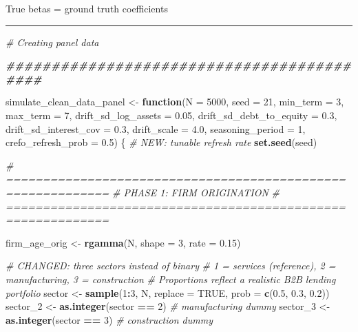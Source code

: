 \documentclass[
]{article}
\newenvironment{Shaded}{\begin{snugshade}}{\end{snugshade}}
\newcommand{\AttributeTok}[1]{\textcolor[rgb]{0.13,0.29,0.53}{#1}}
\newcommand{\CommentTok}[1]{\textcolor[rgb]{0.56,0.35,0.01}{\textit{#1}}}
\newcommand{\ConstantTok}[1]{\textcolor[rgb]{0.56,0.35,0.01}{#1}}
\newcommand{\ControlFlowTok}[1]{\textcolor[rgb]{0.13,0.29,0.53}{\textbf{#1}}}
\newcommand{\DecValTok}[1]{\textcolor[rgb]{0.00,0.00,0.81}{#1}}
\newcommand{\DocumentationTok}[1]{\textcolor[rgb]{0.56,0.35,0.01}{\textbf{\textit{#1}}}}
\newcommand{\FloatTok}[1]{\textcolor[rgb]{0.00,0.00,0.81}{#1}}
\newcommand{\FunctionTok}[1]{\textcolor[rgb]{0.13,0.29,0.53}{\textbf{#1}}}
\newcommand{\NormalTok}[1]{#1}
\newcommand{\OtherTok}[1]{\textcolor[rgb]{0.56,0.35,0.01}{#1}}
\newcommand{\SpecialCharTok}[1]{\textcolor[rgb]{0.81,0.36,0.00}{\textbf{#1}}}
\begin{document}
True betas = ground truth coefficients

\begin{center}\rule{0.5\linewidth}{0.5pt}\end{center}

\begin{Shaded}
\begin{Highlighting}[]
\CommentTok{\# Creating panel data}

\DocumentationTok{\#\#\#\#\#\#\#\#\#\#\#\#\#\#\#\#\#\#\#\#\#\#\#\#\#\#\#\#\#\#\#\#\#\#\#\#\#\#\#\#\#\#}

\NormalTok{simulate\_clean\_data\_panel }\OtherTok{\textless{}{-}} \ControlFlowTok{function}\NormalTok{(}\AttributeTok{N =} \DecValTok{5000}\NormalTok{, }\AttributeTok{seed =} \DecValTok{21}\NormalTok{,}
                                      \AttributeTok{min\_term =} \DecValTok{3}\NormalTok{, }\AttributeTok{max\_term =} \DecValTok{7}\NormalTok{,}
                                      \AttributeTok{drift\_sd\_log\_assets     =} \FloatTok{0.05}\NormalTok{,}
                                      \AttributeTok{drift\_sd\_debt\_to\_equity =} \FloatTok{0.3}\NormalTok{,}
                                      \AttributeTok{drift\_sd\_interest\_cov   =} \FloatTok{0.3}\NormalTok{,}
                                      \AttributeTok{drift\_scale             =} \FloatTok{4.0}\NormalTok{,}
                                      \AttributeTok{seasoning\_period        =} \DecValTok{1}\NormalTok{,}
                                      \AttributeTok{crefo\_refresh\_prob      =} \FloatTok{0.5}\NormalTok{) \{  }\CommentTok{\# NEW: tunable refresh rate}
  \FunctionTok{set.seed}\NormalTok{(seed)}
  
  \CommentTok{\# ============================================================}
  \CommentTok{\# PHASE 1: FIRM ORIGINATION}
  \CommentTok{\# ============================================================}
  
\NormalTok{  firm\_age\_orig }\OtherTok{\textless{}{-}} \FunctionTok{rgamma}\NormalTok{(N, }\AttributeTok{shape =} \DecValTok{3}\NormalTok{, }\AttributeTok{rate =} \FloatTok{0.15}\NormalTok{)}
  
  \CommentTok{\# CHANGED: three sectors instead of binary}
  \CommentTok{\# 1 = services (reference), 2 = manufacturing, 3 = construction}
  \CommentTok{\# Proportions reflect a realistic B2B lending portfolio}
\NormalTok{  sector   }\OtherTok{\textless{}{-}} \FunctionTok{sample}\NormalTok{(}\DecValTok{1}\SpecialCharTok{:}\DecValTok{3}\NormalTok{, N, }\AttributeTok{replace =} \ConstantTok{TRUE}\NormalTok{, }\AttributeTok{prob =} \FunctionTok{c}\NormalTok{(}\FloatTok{0.5}\NormalTok{, }\FloatTok{0.3}\NormalTok{, }\FloatTok{0.2}\NormalTok{))}
\NormalTok{  sector\_2 }\OtherTok{\textless{}{-}} \FunctionTok{as.integer}\NormalTok{(sector }\SpecialCharTok{==} \DecValTok{2}\NormalTok{)   }\CommentTok{\# manufacturing dummy}
\NormalTok{  sector\_3 }\OtherTok{\textless{}{-}} \FunctionTok{as.integer}\NormalTok{(sector }\SpecialCharTok{==} \DecValTok{3}\NormalTok{)   }\CommentTok{\# construction dummy}
  

\end{Highlighting}
\end{Shaded}
\end{document}
